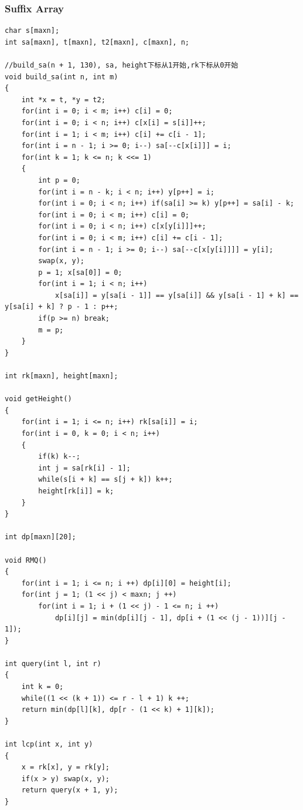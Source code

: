 \documentclass[twoside]{article}
\begin{document}
\subsubsection{Suffix Array}
\begin{lstlisting}
char s[maxn];
int sa[maxn], t[maxn], t2[maxn], c[maxn], n;

//build_sa(n + 1, 130), sa, height下标从1开始,rk下标从0开始
void build_sa(int n, int m) 
{
    int *x = t, *y = t2;
    for(int i = 0; i < m; i++) c[i] = 0;
    for(int i = 0; i < n; i++) c[x[i] = s[i]]++;
    for(int i = 1; i < m; i++) c[i] += c[i - 1];
    for(int i = n - 1; i >= 0; i--) sa[--c[x[i]]] = i;
    for(int k = 1; k <= n; k <<= 1)
    {
        int p = 0;
        for(int i = n - k; i < n; i++) y[p++] = i;
        for(int i = 0; i < n; i++) if(sa[i] >= k) y[p++] = sa[i] - k;
        for(int i = 0; i < m; i++) c[i] = 0;
        for(int i = 0; i < n; i++) c[x[y[i]]]++;
        for(int i = 0; i < m; i++) c[i] += c[i - 1];
        for(int i = n - 1; i >= 0; i--) sa[--c[x[y[i]]]] = y[i];
        swap(x, y);
        p = 1; x[sa[0]] = 0;
        for(int i = 1; i < n; i++)
            x[sa[i]] = y[sa[i - 1]] == y[sa[i]] && y[sa[i - 1] + k] == y[sa[i] + k] ? p - 1 : p++;
        if(p >= n) break;
        m = p;
    }
}

int rk[maxn], height[maxn];

void getHeight()
{
    for(int i = 1; i <= n; i++) rk[sa[i]] = i;
    for(int i = 0, k = 0; i < n; i++)
    {
        if(k) k--;
        int j = sa[rk[i] - 1];
        while(s[i + k] == s[j + k]) k++;
        height[rk[i]] = k;
    }
}

int dp[maxn][20];

void RMQ()
{
    for(int i = 1; i <= n; i ++) dp[i][0] = height[i];
    for(int j = 1; (1 << j) < maxn; j ++)
        for(int i = 1; i + (1 << j) - 1 <= n; i ++)
            dp[i][j] = min(dp[i][j - 1], dp[i + (1 << (j - 1))][j - 1]);
}

int query(int l, int r)
{
    int k = 0;
    while((1 << (k + 1)) <= r - l + 1) k ++;
    return min(dp[l][k], dp[r - (1 << k) + 1][k]);
}

int lcp(int x, int y)
{
    x = rk[x], y = rk[y];
    if(x > y) swap(x, y);
    return query(x + 1, y);
}                                                                  \end{lstlisting}
\end{document}
